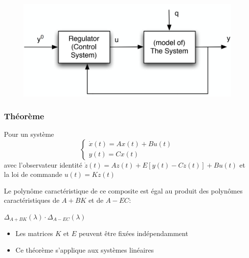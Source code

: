 \documentclass[resume]{subfiles}
\begin{document}
\begin{figure}[H]
    \centering
    \includegraphics[width=1\columnwidth]{Figures/CtrlStab_1.png}
\end{figure}

\subsubsection{Théorème}

 Pour un système \begin{equation}\begin{cases}\dot{x}(t)=Ax(t)+Bu(t)\\y(t)=Cx(t)\end{cases}\end{equation} avec l'observateur identité $\dot{z}(t)= Az(t)+E[y(t)-Cz(t)]+Bu(t)$ et la loi de commande $u(t)=Kz(t)$ 

Le polynôme caractéristique de ce composite est égal au produit des
polynômes caractéristiques de $A+BK$ et de $A-EC$:  

$\Delta_{A+BK}(\lambda)\cdot \Delta_{A-EC}(\lambda)$  
\begin{itemize}
\item Les matrices $K$ et $E$ peuvent être fixées indépendamment
\item Ce théorème s'applique aux systèmes linéaires  
\end{itemize}
\end{document}
